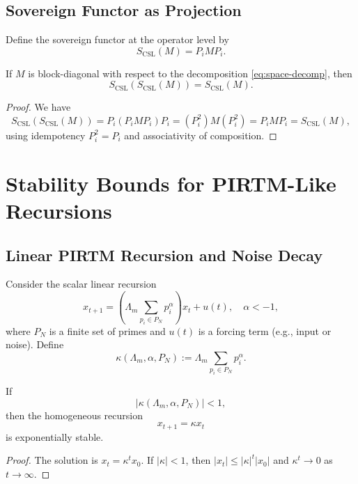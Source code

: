 \documentclass[11pt]{article}
\begin{document}
\subsection{Sovereign Functor as Projection}

Define the sovereign functor at the operator level by
\begin{equation}
  S_{\mathrm{CSL}}(M) = P_i M P_i.
\end{equation}

\begin{corollary}
If $M$ is block-diagonal with respect to the decomposition \eqref{eq:space-decomp}, then
\[
  S_{\mathrm{CSL}}(S_{\mathrm{CSL}}(M)) = S_{\mathrm{CSL}}(M).
\]
\end{corollary}

\begin{proof}
We have
\[
  S_{\mathrm{CSL}}(S_{\mathrm{CSL}}(M))
  = P_i (P_i M P_i) P_i
  = (P_i^2) M (P_i^2)
  = P_i M P_i
  = S_{\mathrm{CSL}}(M),
\]
using idempotency $P_i^2 = P_i$ and associativity of composition.
\end{proof}

\section{Stability Bounds for PIRTM-Like Recursions}

\subsection{Linear PIRTM Recursion and Noise Decay}

Consider the scalar linear recursion
\begin{equation}
  x_{t+1}
  = \left( \Lambda_m \sum_{p_i \in P_N} p_i^\alpha \right) x_t + u(t),
  \quad \alpha < -1,
  \label{eq:scalar-pirtm}
\end{equation}
where $P_N$ is a finite set of primes and $u(t)$ is a forcing term (e.g., input or noise).
Define
\[
  \kappa(\Lambda_m, \alpha, P_N)
  := \Lambda_m \sum_{p_i \in P_N} p_i^\alpha.
\]

\begin{lemma}
If
\[
  \lvert \kappa(\Lambda_m, \alpha, P_N) \rvert < 1,
\]
then the homogeneous recursion
\[
  x_{t+1} = \kappa x_t
\]
is exponentially stable.
\end{lemma}

\begin{proof}
The solution is $x_t = \kappa^t x_0$.
If $\lvert \kappa \rvert < 1$, then $\lvert x_t \rvert \le \lvert \kappa \rvert^t \lvert x_0 \rvert$ and $\kappa^t \to 0$ as $t \to \infty$.
\end{proof}
\end{document}
